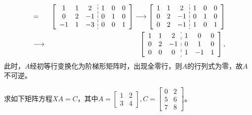 \begin{solution}
\begin{eqnarray*}
[A,I] & = &
  \setlength{\dashlinegap}{2pt}
  \left[ \begin{array}{ccc:ccc}
    1 & 1 & 2 & 1 & 0 & 0 \\ 0 & 2 & -1 & 0 & 1 & 0 \\ -1 & 1 & -3 & 0 & 0 & 1
  \end{array} \right] \longrightarrow
  \left[ \begin{array}{ccc:ccc}
     1 & 1 & 2 & 1 & 0 & 0 \\ 0 & 2 & -1 & 0 & 1 & 0 \\ 0 & 2 & -1 & 1 & 0 & 1
  \end{array} \right] \\
  & \longrightarrow & \left[ \begin{array}{ccc:ccc}
      1 & 1 & 2 & 1 & 0 & 0 \\ 0 & 2 & -1 & 0 & 1 & 0 \\ 0 & 0 & 0 & 1 & -1 & 1
   \end{array} \right],
\end{eqnarray*}
此时，$A$经初等行变换化为阶梯形矩阵时，出现全零行，则$A$的行列式为零，故$A$不可逆。
\end{solution}

\begin{eg}
求如下矩阵方程$XA=C$，其中$A = \begin{bmatrix} 1 & 2 \\ 3 & 4 \end{bmatrix}, C = \begin{bmatrix} 0 & 2 \\ 5 & 6 \\ 7 & 8 \end{bmatrix}$。
\end{eg}

